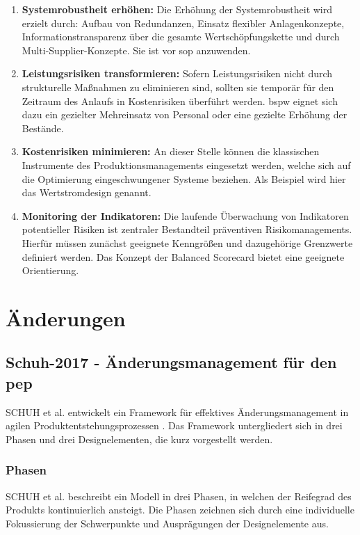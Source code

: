 \begin{enumerate}
 \item \textbf{Systemrobustheit erhöhen: }
 Die Erhöhung der Systemrobustheit wird erzielt durch: Aufbau von Redundanzen, Einsatz flexibler Anlagenkonzepte, Informationstransparenz über die gesamte Wertschöpfungskette und durch Multi-Supplier-Konzepte. Sie ist vor \gls{sop} anzuwenden. 
 \item \textbf{Leistungsrisiken transformieren: }
 Sofern Leistungsrisiken nicht durch strukturelle Maßnahmen zu eliminieren sind, sollten sie temporär für den Zeitraum des Anlaufs in Kostenrisiken überführt werden. \Gls{bspw} eignet sich dazu ein gezielter Mehreinsatz von Personal oder eine gezielte Erhöhung der Bestände. 
 \item \textbf{Kostenrisiken minimieren: }
 An dieser Stelle können die klassischen Instrumente des Produktionsmanagements eingesetzt werden, welche sich auf die Optimierung eingeschwungener Systeme beziehen. Als Beispiel wird hier das Wertstromdesign genannt. 
 \item \textbf{Monitoring der Indikatoren: }
 Die laufende Überwachung von Indikatoren potentieller Risiken ist zentraler Bestandteil präventiven Risikomanagements. 
 Hierfür müssen zunächst geeignete Kenngrößen und dazugehörige Grenzwerte definiert werden. Das Konzept der Balanced Scorecard bietet eine geeignete Orientierung. 
\end{enumerate}

\section{Änderungen}

\subsection*{Schuh-2017 - Änderungsmanagement für den \gls{pep}}\label{sec:schuh2017}
SCHUH et al. entwickelt ein Framework für effektives Änderungsmanagement in agilen Produktentstehungsprozessen \cite{Schuh2017}. Das Framework untergliedert sich in drei Phasen und drei Designelementen, die kurz vorgestellt werden. 

\subsubsection*{Phasen}
SCHUH et al. beschreibt ein Modell in drei Phasen, in welchen der Reifegrad des Produkts kontinuierlich ansteigt. %
Die Phasen zeichnen sich durch eine individuelle Fokussierung der Schwerpunkte und Ausprägungen der Designelemente aus. 

